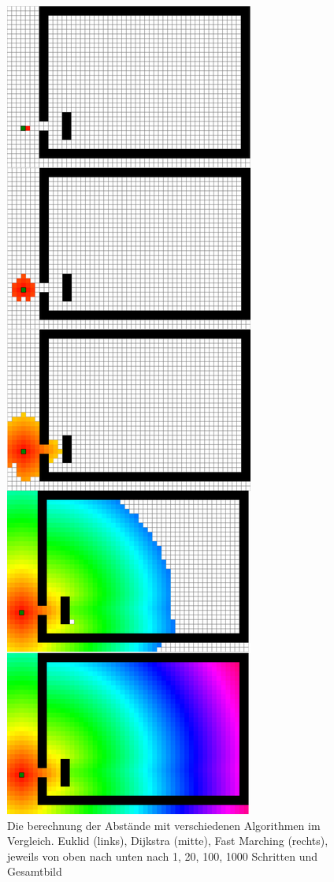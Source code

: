 \begin{figure}
\begin{minipage}{0.32\textwidth}
\end{minipage}
\begin{minipage}{0.32\textwidth}
\centering
  \includegraphics[width=\linewidth]{abbildungen/vergleich_euklid_fast_marching/snapshot_eFastMarching_zusammen_cutted.png}
\end{minipage}
\caption{Die berechnung der Abstände mit verschiedenen Algorithmen im Vergleich. Euklid (links), Dijkstra (mitte), Fast Marching (rechts), jeweils von oben nach unten nach 1, 20, 100, 1000 Schritten und Gesamtbild}
\label{fig_euklid_dijkstra_fast_marching_vergleich}
\end{figure}



